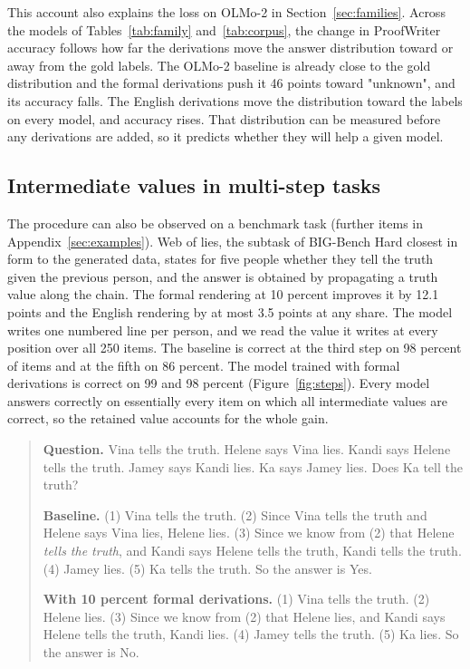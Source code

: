 \documentclass{article}
\begin{document}



This account also explains the loss on OLMo-2 in
Section~\ref{sec:families}. Across the models of
Tables~\ref{tab:family} and~\ref{tab:corpus}, the change in ProofWriter
accuracy follows how far the derivations move the answer distribution toward
or away from the gold labels. The OLMo-2 baseline is already close to the gold distribution and the formal
derivations push it 46 points toward "unknown", and its accuracy falls. The
English derivations move the distribution toward the labels on every model,
and accuracy rises. That distribution can be measured before any derivations
are added, so it predicts whether they will help a given model.

\subsection{Intermediate values in multi-step tasks}
\label{sec:procedure}

The procedure can also be observed on a benchmark task
(further items in Appendix~\ref{sec:examples}). Web of lies, the
subtask of BIG-Bench Hard closest in form to the generated data, states for
five people whether they tell the truth given the previous person, and the
answer is obtained by propagating a truth value along the chain. The formal
rendering at 10 percent improves it by 12.1 points and the English rendering
by at most 3.5 points at any share. The model writes one numbered line per
person, and we read the value it writes at every position over all 250
items. The baseline is correct at the third step on 98 percent of items and
at the fifth on 86 percent. The model trained with formal derivations is
correct on 99 and 98 percent (Figure~\ref{fig:steps}). Every model answers
correctly on essentially every item on which all intermediate values are
correct, so the retained value accounts for the whole gain.

\begin{small}
\begin{quote}
\textbf{Question.} Vina tells the truth. Helene says Vina lies. Kandi says
Helene tells the truth. Jamey says Kandi lies. Ka says Jamey lies. Does Ka
tell the truth?

\textbf{Baseline.} (1) Vina tells the truth. (2) Since Vina tells the truth
and Helene says Vina lies, Helene lies. (3) Since we know from (2) that
Helene \emph{tells the truth}, and Kandi says Helene tells the truth, Kandi
tells the truth. (4) Jamey lies. (5) Ka tells the truth. So the answer is
Yes.

\textbf{With 10 percent formal derivations.} (1) Vina tells the truth. (2)
Helene lies. (3) Since we know from (2) that Helene lies, and Kandi says
Helene tells the truth, Kandi lies. (4) Jamey tells the truth. (5) Ka lies.
So the answer is No.
\end{quote}
\end{small}
\end{document}
